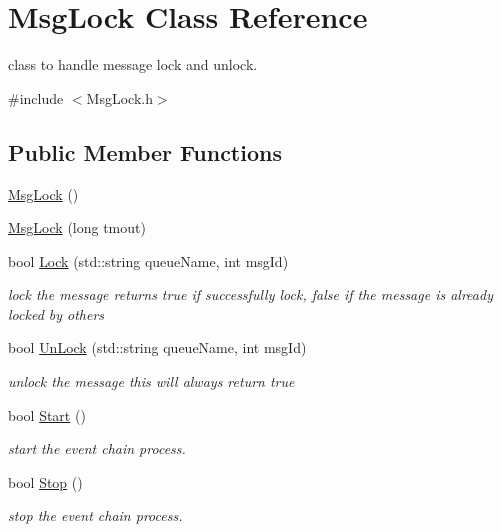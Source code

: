 \hypertarget{classMsgLock}{\section{\-Msg\-Lock \-Class \-Reference}
\label{da/d01/classMsgLock}
}


class to handle message lock and unlock.  




{\ttfamily \#include $<$\-Msg\-Lock.\-h$>$}

\subsection*{\-Public \-Member \-Functions}
\begin{DoxyCompactItemize}
\item 
\hyperlink{classMsgLock_a29a504bb53629c05ecb9e09dc8bd08ec}{\-Msg\-Lock} ()
\item 
\hyperlink{classMsgLock_a6f2097905a4ed2e3a0129de845d5fe63}{\-Msg\-Lock} (long tmout)
\item 
bool \hyperlink{classMsgLock_abefa80b2195e058a42e28496607c1781}{\-Lock} (std\-::string queue\-Name, int msg\-Id)
\begin{DoxyCompactList}\small\item\em lock the message returns true if successfully lock, false if the message is already locked by others \end{DoxyCompactList}\item 
bool \hyperlink{classMsgLock_ab13af89818d9c55ad8a2b1350f83c123}{\-Un\-Lock} (std\-::string queue\-Name, int msg\-Id)
\begin{DoxyCompactList}\small\item\em unlock the message this will always return true \end{DoxyCompactList}\item 
bool \hyperlink{classMsgLock_aabe3da15ec94dbb5ec28cb1122d01f1f}{\-Start} ()
\begin{DoxyCompactList}\small\item\em start the event chain process. \end{DoxyCompactList}\item 
bool \hyperlink{classMsgLock_aacf751266c7c5bd26e96950f56e59ab4}{\-Stop} ()
\begin{DoxyCompactList}\small\item\em stop the event chain process. \end{DoxyCompactList}\end{DoxyCompactItemize}
